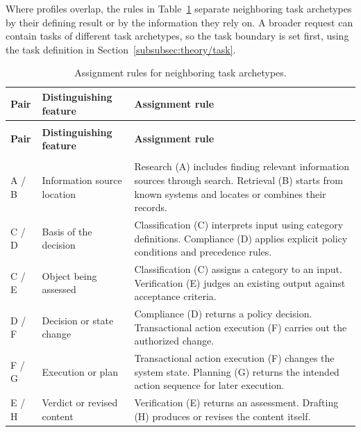 Where profiles overlap, the rules in Table~\ref{tab:app-archetype-boundaries} separate neighboring task archetypes by their defining result or by the information they rely on. A broader request can contain tasks of different task archetypes, so the task boundary is set first, using the task definition in Section~\ref{subsubsec:theory/task}.

\begingroup
\renewcommand{\baselinestretch}{1}
\small
\setlength{\tabcolsep}{4pt}
\renewcommand{\arraystretch}{1.08}
\begin{longtable}{>{\raggedright\arraybackslash}p{} >{\raggedright\arraybackslash}p{} >{\raggedright\arraybackslash}p{}}
\caption[Assignment rules for neighboring task archetypes]{Assignment rules for neighboring task archetypes.}\label{tab:app-archetype-boundaries} \\
\toprule
\textbf{Pair} & \textbf{Distinguishing feature} & \textbf{Assignment rule} \\
\midrule
\endfirsthead
\multicolumn{3}{l}{\tablename~\thetable{} (continued)} \\
\toprule
\textbf{Pair} & \textbf{Distinguishing feature} & \textbf{Assignment rule} \\
\midrule
\endhead
\midrule
\multicolumn{3}{r}{\emph{Continued on the next page.}} \\
\endfoot
\bottomrule
\endlastfoot
A / B & Information source location & Research (A) includes finding relevant information sources through search. Retrieval (B) starts from known systems and locates or combines their records. \\
\addlinespace[2.5pt]
C / D & Basis of the decision & Classification (C) interprets input using category definitions. Compliance (D) applies explicit policy conditions and precedence rules. \\
\addlinespace[2.5pt]
C / E & Object being assessed & Classification (C) assigns a category to an input. Verification (E) judges an existing output against acceptance criteria. \\
\addlinespace[2.5pt]
D / F & Decision or state change & Compliance (D) returns a policy decision. Transactional action execution (F) carries out the authorized change. \\
\addlinespace[2.5pt]
F / G & Execution or plan & Transactional action execution (F) changes the system state. Planning (G) returns the intended action sequence for later execution. \\
\addlinespace[2.5pt]
E / H & Verdict or revised content & Verification (E) returns an assessment. Drafting (H) produces or revises the content itself. \\
\end{longtable}
\endgroup

